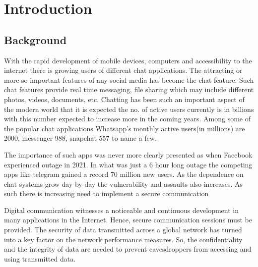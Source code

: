 
\newpage
{} %

\chapter{Introduction}
\section{Background}\label{sec:bkgrnd}%
With the rapid development of mobile devices, computers and accessibility to the internet there is growing users of different chat applications. The attracting or more so important features of any social media has become the chat feature. Such chat features provide real time messaging, file sharing which may include different photos, videos, documents, etc. Chatting has been such an important aspect of the modern world that it is expected the no. of active users currently is in billions with this number expected to increase more in the coming years. Among some of the popular chat applications Whatsapp’s monthly active users(in millions) are 2000, messenger 988, snapchat 557 to name a few.\cite{Barakat2018}

The importance of such apps was never more clearly presented as when Facebook experienced outage in 2021. In what was just a 6 hour long outage the competing apps like telegram gained a record 70 million new users.
As the dependence on chat systems grow day by day the vulnerability and assaults also increases. As such  there is increasing need to implement a secure communication

Digital communication witnesses a noticeable and continuous development in
many applications in the Internet. Hence, secure communication sessions must be
provided. The security of data transmitted across a global network has turned into a
key factor on the network performance measures. So, the confidentiality and the
integrity of data are needed to prevent eavesdroppers from accessing and using
transmitted data.

